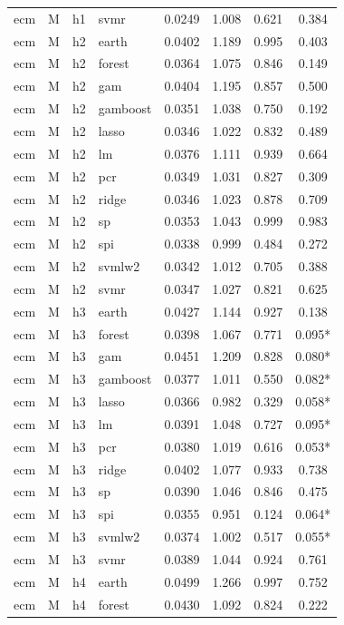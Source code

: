 \begin{ThreePartTable}
\begin{longtable}[t]{llclcccc}
ecm & M & h1 & svmr & 0.0249 & 1.008 & 0.621 & 0.384\\
\addlinespace
ecm & M & h2 & earth & 0.0402 & 1.189 & 0.995 & 0.403\\
ecm & M & h2 & forest & 0.0364 & 1.075 & 0.846 & 0.149\\
ecm & M & h2 & gam & 0.0404 & 1.195 & 0.857 & 0.500\\
ecm & M & h2 & gamboost & 0.0351 & 1.038 & 0.750 & 0.192\\
ecm & M & h2 & lasso & 0.0346 & 1.022 & 0.832 & 0.489\\
ecm & M & h2 & lm & 0.0376 & 1.111 & 0.939 & 0.664\\
ecm & M & h2 & pcr & 0.0349 & 1.031 & 0.827 & 0.309\\
ecm & M & h2 & ridge & 0.0346 & 1.023 & 0.878 & 0.709\\
ecm & M & h2 & sp & 0.0353 & 1.043 & 0.999 & 0.983\\
ecm & M & h2 & spi & 0.0338 & 0.999 & 0.484 & 0.272\\
ecm & M & h2 & svmlw2 & 0.0342 & 1.012 & 0.705 & 0.388\\
ecm & M & h2 & svmr & 0.0347 & 1.027 & 0.821 & 0.625\\
\addlinespace
ecm & M & h3 & earth & 0.0427 & 1.144 & 0.927 & 0.138\\
ecm & M & h3 & forest & 0.0398 & 1.067 & 0.771 & 0.095*\\
ecm & M & h3 & gam & 0.0451 & 1.209 & 0.828 & 0.080*\\
ecm & M & h3 & gamboost & 0.0377 & 1.011 & 0.550 & 0.082*\\
ecm & M & h3 & lasso & 0.0366 & 0.982 & 0.329 & 0.058*\\
ecm & M & h3 & lm & 0.0391 & 1.048 & 0.727 & 0.095*\\
ecm & M & h3 & pcr & 0.0380 & 1.019 & 0.616 & 0.053*\\
ecm & M & h3 & ridge & 0.0402 & 1.077 & 0.933 & 0.738\\
ecm & M & h3 & sp & 0.0390 & 1.046 & 0.846 & 0.475\\
ecm & M & h3 & spi & 0.0355 & 0.951 & 0.124 & 0.064*\\
ecm & M & h3 & svmlw2 & 0.0374 & 1.002 & 0.517 & 0.055*\\
ecm & M & h3 & svmr & 0.0389 & 1.044 & 0.924 & 0.761\\
\addlinespace
ecm & M & h4 & earth & 0.0499 & 1.266 & 0.997 & 0.752\\
ecm & M & h4 & forest & 0.0430 & 1.092 & 0.824 & 0.222\\

\end{longtable}
\end{ThreePartTable}
